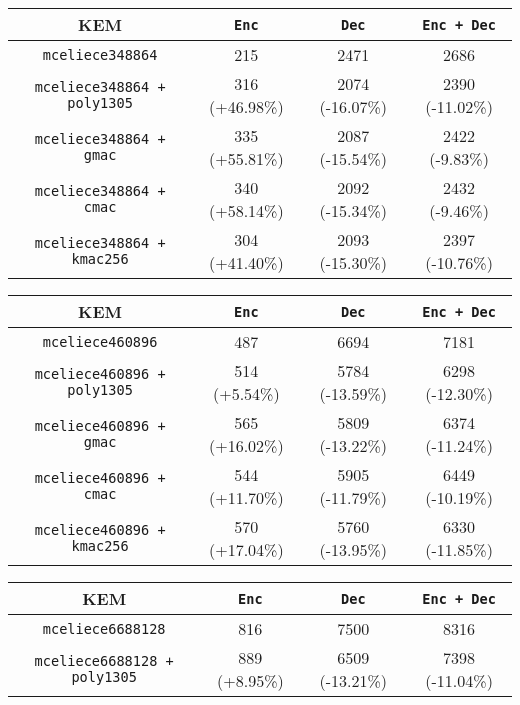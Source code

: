 \documentclass[runningheads]{llncs}
\begin{document}
\begin{table}[hp]
    \centering
    \begin{tabular}[c]{|c|c|c|c|}
        \hline
        KEM & \texttt{Enc} & \texttt{Dec} & \texttt{Enc + Dec} \\
        \hline
        \texttt{mceliece348864} & 215 & 2471 & 2686 \\
        \hline
        \texttt{mceliece348864 + poly1305} & 316 (+46.98\%) & 2074 (-16.07\%) & 2390 (-11.02\%) \\
        \hline
        \texttt{mceliece348864 + gmac} & 335 (+55.81\%) & 2087 (-15.54\%) & 2422 (-9.83\%) \\
        \hline
        \texttt{mceliece348864 + cmac} & 340 (+58.14\%) & 2092 (-15.34\%) & 2432 (-9.46\%) \\
        \hline
        \texttt{mceliece348864 + kmac256} & 304 (+41.40\%) & 2093 (-15.30\%) & 2397 (-10.76\%) \\
        \hline
    \end{tabular}\vspace{1em}
    \begin{tabular}[c]{|c|c|c|c|}
        \hline
        KEM & \texttt{Enc} & \texttt{Dec} & \texttt{Enc + Dec} \\
        \hline
        \texttt{mceliece460896} & 487 & 6694 & 7181 \\
        \hline
        \texttt{mceliece460896 + poly1305} & 514 (+5.54\%) & 5784 (-13.59\%) & 6298 (-12.30\%) \\
        \hline
        \texttt{mceliece460896 + gmac} & 565 (+16.02\%) & 5809 (-13.22\%) & 6374 (-11.24\%) \\
        \hline
        \texttt{mceliece460896 + cmac} & 544 (+11.70\%) & 5905 (-11.79\%) & 6449 (-10.19\%) \\
        \hline
        \texttt{mceliece460896 + kmac256} & 570 (+17.04\%) & 5760 (-13.95\%) & 6330 (-11.85\%) \\
        \hline
    \end{tabular}\vspace{1em}
    \begin{tabular}[c]{|c|c|c|c|}
        \hline
        KEM & \texttt{Enc} & \texttt{Dec} & \texttt{Enc + Dec} \\
        \hline
        \texttt{mceliece6688128} & 816 & 7500 & 8316 \\
        \hline
        \texttt{mceliece6688128 + poly1305} & 889 (+8.95\%) & 6509 (-13.21\%) & 7398 (-11.04\%) \\

\end{tabular}
\end{table}
\end{document}
